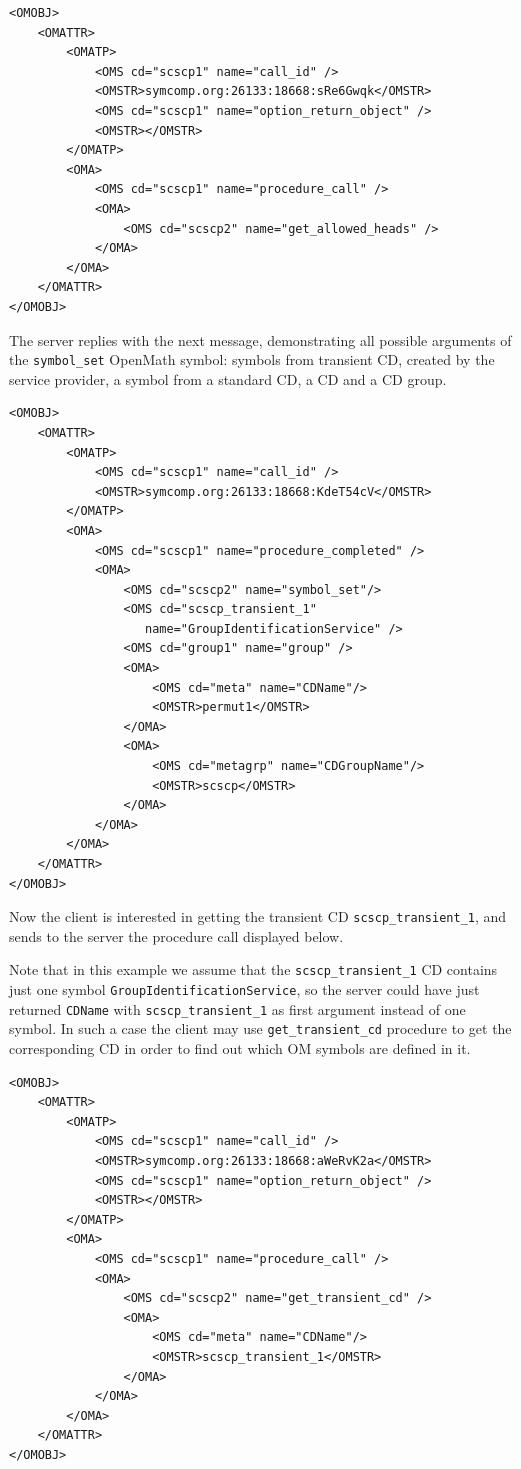 \documentclass{amsart}
\begin{document}
\begin{verbatim}
<OMOBJ>
    <OMATTR>
        <OMATP>
            <OMS cd="scscp1" name="call_id" />
            <OMSTR>symcomp.org:26133:18668:sRe6Gwqk</OMSTR>
            <OMS cd="scscp1" name="option_return_object" />
            <OMSTR></OMSTR>
        </OMATP>
        <OMA>
            <OMS cd="scscp1" name="procedure_call" />
            <OMA>
                <OMS cd="scscp2" name="get_allowed_heads" />
            </OMA>    
        </OMA>
    </OMATTR>
</OMOBJ>
\end{verbatim}

The server replies with the next message, demonstrating
all possible arguments of the \verb|symbol_set| OpenMath symbol:
symbols from transient CD, created by the service provider,
a symbol from a standard CD, a CD and a CD group.

\begin{verbatim}
<OMOBJ>
    <OMATTR>
        <OMATP>
            <OMS cd="scscp1" name="call_id" />
            <OMSTR>symcomp.org:26133:18668:KdeT54cV</OMSTR>
        </OMATP>        
        <OMA>
            <OMS cd="scscp1" name="procedure_completed" />
            <OMA>
                <OMS cd="scscp2" name="symbol_set"/>
                <OMS cd="scscp_transient_1" 
                   name="GroupIdentificationService" />
                <OMS cd="group1" name="group" />
                <OMA>
                    <OMS cd="meta" name="CDName"/>
                    <OMSTR>permut1</OMSTR>
                </OMA>  
                <OMA>
                    <OMS cd="metagrp" name="CDGroupName"/>
                    <OMSTR>scscp</OMSTR>
                </OMA>                         
            </OMA>
        </OMA>
    </OMATTR>
</OMOBJ>
\end{verbatim}

Now the client is interested in getting the transient CD \verb|scscp_transient_1|,
and sends to the server the procedure call displayed below.

Note that in this example we assume that the \verb|scscp_transient_1| 
CD contains just one symbol
{\tt GroupIdentificationService}, so the server could have just returned
{\tt CDName} with \verb|scscp_transient_1| as first argument instead of one symbol. 
In such a case the client may use \verb|get_transient_cd| procedure to get the
corresponding CD in order to find out which OM symbols are defined 
in it. 

\begin{verbatim}
<OMOBJ>
    <OMATTR>
        <OMATP>
            <OMS cd="scscp1" name="call_id" />
            <OMSTR>symcomp.org:26133:18668:aWeRvK2a</OMSTR>
            <OMS cd="scscp1" name="option_return_object" />
            <OMSTR></OMSTR>
        </OMATP>
        <OMA>
            <OMS cd="scscp1" name="procedure_call" />
            <OMA>
                <OMS cd="scscp2" name="get_transient_cd" />
                <OMA>
                    <OMS cd="meta" name="CDName"/>
                    <OMSTR>scscp_transient_1</OMSTR>
                </OMA>
            </OMA>        
        </OMA>
    </OMATTR>
</OMOBJ>
\end{verbatim}
\end{document}
